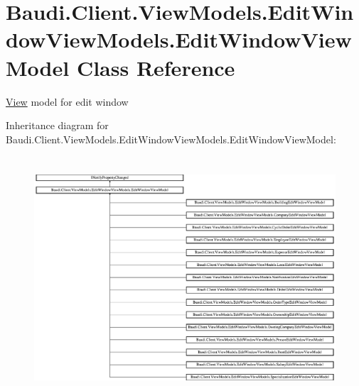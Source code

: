 \hypertarget{class_baudi_1_1_client_1_1_view_models_1_1_edit_window_view_models_1_1_edit_window_view_model}{}\section{Baudi.\+Client.\+View\+Models.\+Edit\+Window\+View\+Models.\+Edit\+Window\+View\+Model Class Reference}
\label{class_baudi_1_1_client_1_1_view_models_1_1_edit_window_view_models_1_1_edit_window_view_model}


\hyperlink{namespace_baudi_1_1_client_1_1_view}{View} model for edit window  


Inheritance diagram for Baudi.\+Client.\+View\+Models.\+Edit\+Window\+View\+Models.\+Edit\+Window\+View\+Model\+:\begin{figure}[H]
\begin{center}
\leavevmode
\includegraphics[height=9.032258cm]{class_baudi_1_1_client_1_1_view_models_1_1_edit_window_view_models_1_1_edit_window_view_model}
\end{center}
\end{figure}
